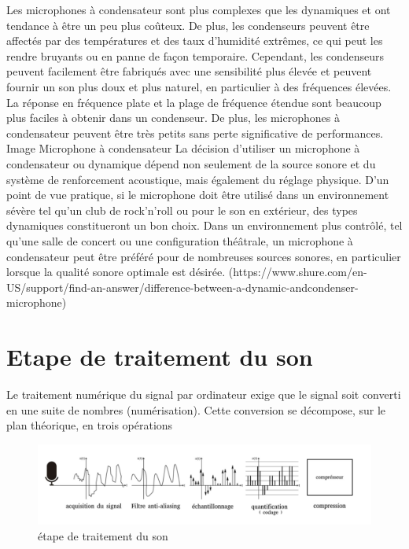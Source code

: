 \documentclass[a4paper, 12pt]{book}
\begin{document}
Les microphones à condensateur sont plus complexes que les dynamiques et ont tendance à être un peu plus coûteux. De plus, les condenseurs peuvent être affectés par des températures et des taux d'humidité extrêmes, ce qui peut les rendre bruyants ou en panne de façon temporaire. Cependant, les condenseurs peuvent facilement être fabriqués avec une sensibilité plus élevée et peuvent fournir un son plus doux et plus naturel, en particulier à des fréquences élevées. La réponse en fréquence plate et la plage de fréquence étendue sont beaucoup plus faciles à obtenir dans un condenseur. De plus, les microphones à condensateur peuvent être très petits sans perte significative de performances. Image Microphone à condensateur La décision d’utiliser un microphone à condensateur ou dynamique dépend non seulement de la source sonore et du système de renforcement acoustique, mais également du réglage physique. D'un point de vue pratique, si le microphone doit être utilisé dans un environnement sévère tel qu'un club de rock'n'roll ou pour le son en extérieur, des types dynamiques constitueront un bon choix. Dans un environnement plus contrôlé, tel qu'une salle de concert ou une configuration théâtrale, un microphone à condensateur peut être préféré pour de nombreuses sources sonores, en particulier lorsque la qualité sonore optimale est désirée. (https://www.shure.com/en-US/support/find-an-answer/difference-between-a-dynamic-andcondenser-microphone)

\section{Etape de traitement du son}

Le traitement numérique du signal par ordinateur exige que le signal soit converti en une suite de nombres (numérisation). Cette conversion se décompose, sur le plan théorique, en trois opérations

\begin{figure}[htbp]
  \centering
  \includegraphics[width=1.2\linewidth]{fig/etape-acquisition-son.png}
  \caption{étape de traitement du son}
\end{figure}
\end{document}
